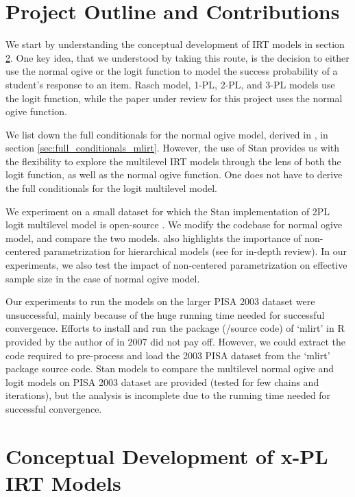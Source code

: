\documentclass[12pt]{article}
\begin{document}
\section{Project Outline and Contributions}
We start by understanding the conceptual development of IRT models in section \ref{sec:xpl_irt}. One key idea, that we understood by taking this route, is the decision to either use the normal ogive or the logit function to model the success probability of a student's response to an item. Rasch model, 1-PL, 2-PL, and 3-PL models use the logit function, while the paper under review for this project \cite{fox2001bayesian} uses the normal ogive function.

We list down the full conditionals for the normal ogive model, derived in \cite{fox2001bayesian}, in section \ref{sec:full_conditionals_mlirt}. However, the use of Stan provides us with the flexibility to explore the multilevel IRT models through the lens of both the logit function, as well as the normal ogive function. One does not have to derive the full conditionals for the logit multilevel model.

We experiment on a small dataset \cite{thissen1993detection} for which the Stan implementation of 2PL logit multilevel model is open-source \cite{furr2016two}. We modify the codebase for normal ogive model, and compare the two models. \cite{furr2016two} also highlights the importance of non-centered parametrization for hierarchical models (see \cite{papaspiliopoulos2007general} for in-depth review). In our experiments, we also test the impact of non-centered parametrization on effective sample size in the case of normal ogive model.

Our experiments to run the models on the larger PISA 2003 dataset were unsuccessful, mainly because of the huge running time needed for successful convergence. Efforts to install and run the package (/source code) of `mlirt' in R provided by the author of \cite{fox2001bayesian} in 2007 \cite{fox2007multilevel} did not pay off. However, we could extract the code required to pre-process and load the 2003 PISA dataset from the `mlirt' package source code. Stan models to compare the multilevel normal ogive and logit models on PISA 2003 dataset are provided (tested for few chains and iterations), but the analysis is incomplete due to the running time needed for successful convergence.

\section{Conceptual Development of x-PL IRT Models} \label{sec:xpl_irt}
\end{document}
